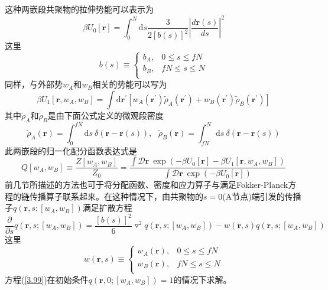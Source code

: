 这种两嵌段共聚物的拉伸势能可以表示为
\begin{equation}
\beta U_0[\mathbf{r}]=\int_{0}^{N} \mathrm{d}s\frac{3}{2[b(s)]^2}\left| \frac{d\mathbf{r}(s)}{ds} \right|^2
\end{equation}
这里
\begin{equation}
b(s)\equiv
\begin{cases}
b_A, & 0\leq s \leq fN \\
b_B, & fN \leq s \leq N\\
\end{cases}
\end{equation}
同样，与外部势$w_A$和$w_B$相关的势能可以写为
\begin{equation}
\beta U_1[\mathbf{r},w_A,w_B]=\int \mathrm{d}\mathbf{r}^{'}[w_A(\mathbf{r}^{'})\tilde{\rho}_{A}(\mathbf{r}^{'})+w_B(\mathbf{r}^{'})\tilde{\rho}_{B}(\mathbf{r}^{'})]
\end{equation}
其中$\tilde{\rho} _A$和$\tilde{\rho} _B$是由下面公式定义的微观段密度
\begin{equation}
\tilde{\rho} _A(\mathbf{r})=\int _0^{fN} \mathrm{d}s~\delta(\mathbf{r}-\mathbf{r}(s)),~~~\tilde{\rho} _B(\mathbf{r})=\int _{fN}^{N} \mathrm{d}s~\delta(\mathbf{r}-\mathbf{r}(s))
\end{equation}
此两嵌段的归一化配分函数表达式是
\begin{equation}
Q[w_A,w_B]\equiv\frac{Z[w_A,w_B]}{Z_0}=\frac{\int \mathcal{D}\mathbf{r}~\exp(-\beta U_0[\mathbf{r}]-\beta U_1[\mathbf{r},w_A,w_B])}{\int \mathcal{D}\mathbf{r}~\exp(-\beta U_0[\mathbf{r}])}
\end{equation}
前几节所描述的方法也可于将分配函数、密度和应力算子与满足Fokker-Planck方程的链传播算子联系起来。在这种情况下，由共聚物的$s=0$(A节点)端引发的传播子$q(\mathbf{r},s;[w_A,w_B])$满足扩散方程
\begin{equation}
\frac{\partial}{\partial s}q(\mathbf{r},s;[w_A,w_B])=\frac{[b(s)]^2}{6}\triangledown ^2q(\mathbf{r},s;[w_A,w_B])-w(\mathbf{r},s)q(\mathbf{r},s;[w_A,w_B]) \label{3.99}
\end{equation}
这里
\begin{equation}
w(\mathbf{r},s)\equiv
\begin{cases}
w_A(\mathbf{r}), & 0\leq s \leq fN \\
w_B(\mathbf{r}), & fN \leq s \leq N\\
\end{cases}
\end{equation}
方程(\ref{3.99})在初始条件$q(\mathbf{r},0;[w_A,w_B])=1$的情况下求解。

